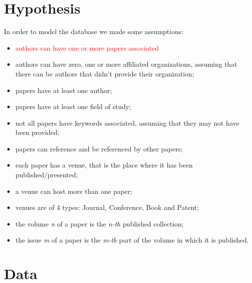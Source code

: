 \documentclass{Configuration_Files/PoliMi3i_thesis}
\begin{document}
\section{Hypothesis}
\label{se:hypo1}
In order to model the database we made some assumptions:
\begin{itemize}
    \item \textcolor{red}{authors can have one or more papers associated}
    \item authors can have zero, one or more affiliated organizations, assuming that there can be authors that didn't provide their organization; 
    \item papers have at least one author;
    \item papers have at least one field of study;
    \item not all papers have keywords associated, assuming that they may not have been provided;
    \item papers can reference and be referenced by other papers;
    \item each paper has a venue, that is the place where it has been published/presented;
    \item a venue can host more than one paper;
    \item venues are of 4 types: Journal, Conference, Book and Patent;
    \item the volume \textit{n} of a paper is the \textit{n-th} published collection;
    \item the issue \textit{m} of a paper is the \textit{m-th} part of the volume in which it is published.
\end{itemize}
\section{Data}
\label{se:data1}
\end{document}
